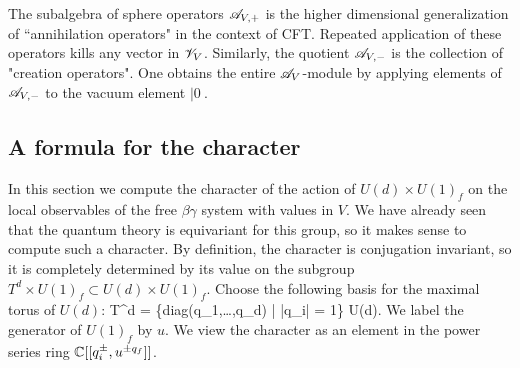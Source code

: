\begin{rmk}
The subalgebra of sphere operators $\mathscr A_{V,+}$ is the higher dimensional generalization of ``annihilation operators" in the context of CFT. 
Repeated application of these operators kills any vector in $\mathscr V_V$.
Similarly, the quotient $\mathscr A_{V,-}$ is the collection of "creation operators". 
One obtains the entire $\mathscr A_V$-module by applying elements of $\mathscr A_{V,-}$ to the vacuum element $|0\>$. 
\end{rmk}

%
%

\subsection{A formula for the character}

In this section we compute the character of the action of $U(d) \times U(1)_f$ on the local observables of the free $\beta\gamma$ system with values in $V$. 
We have already seen that the quantum theory is equivariant for this group, so it makes sense to compute such a character.
By definition, the character is conjugation invariant, so it is completely determined by its value on the subgroup $T^d \times U(1)_f \subset U(d) \times U(1)_f$. 
Choose the following basis for the maximal torus of $U(d)$: 
\ben
T^d = \{{\rm diag}(q_1,\ldots,q_d) \; | \; |q_i| = 1\} \subset U(d).
\een 
We label the generator of $U(1)_f$ by $u$. 
We view the character as an element in the power series ring $\mathbb C[[q_i^{\pm}, u^{\pm q_f}]]$. 

